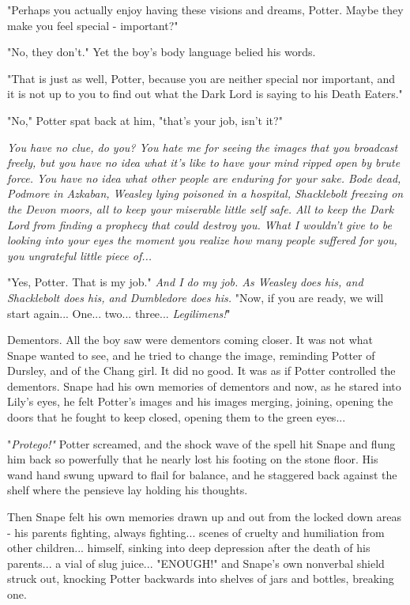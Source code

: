 "Perhaps you actually enjoy having these visions and dreams, Potter. Maybe they make you feel special - important?"

"No, they don't." Yet the boy's body language belied his words.

"That is just as well, Potter, because you are neither special nor important, and it is not up to you to find out what the Dark Lord is saying to his Death Eaters."

"No," Potter spat back at him, "that's your job, isn't it?"

\emph{You have no clue, do you? You hate me for seeing the images that you broadcast freely, but you have no idea what it's like to have your mind ripped open by brute force. You have no idea what other people are enduring for your sake. Bode dead, Podmore in Azkaban, Weasley lying poisoned in a hospital, Shacklebolt freezing on the Devon moors, all to keep your miserable little self safe. All to keep the Dark Lord from finding a prophecy that could destroy you. What I wouldn't give to be looking into your eyes the moment you realize how many people suffered for you, you ungrateful little piece of...}

"Yes, Potter. That is my job." \emph{And I do my job. As Weasley does his, and Shacklebolt does his, and Dumbledore does his.} "Now, if you are ready, we will start again... One... two... three... \emph{Legilimens!}"

Dementors. All the boy saw were dementors coming closer. It was not what Snape wanted to see, and he tried to change the image, reminding Potter of Dursley, and of the Chang girl. It did no good. It was as if Potter controlled the dementors. Snape had his own memories of dementors and now, as he stared into Lily's eyes, he felt Potter's images and his images merging, joining, opening the doors that he fought to keep closed, opening them to the green eyes...

"\emph{Protego!"} Potter screamed, and the shock wave of the spell hit Snape and flung him back so powerfully that he nearly lost his footing on the stone floor. His wand hand swung upward to flail for balance, and he staggered back against the shelf where the pensieve lay holding his thoughts.

Then Snape felt his own memories drawn up and out from the locked down areas - his parents fighting, always fighting... scenes of cruelty and humiliation from other children... himself, sinking into deep depression after the death of his parents... a vial of slug juice... "ENOUGH!" and Snape's own nonverbal shield struck out, knocking Potter backwards into shelves of jars and bottles, breaking one.

